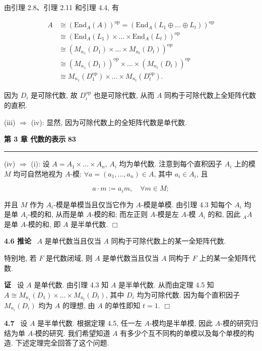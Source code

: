 \documentclass[11pt,a4paper]{article}
\begin{document}
由引理 2.8、引理 2.11 和引理 4.4, 有

$$
\begin{aligned}
A &\cong (\mathrm{End}_A(A))^{\mathrm{op}} = (\mathrm{End}_A(L_1 \oplus \dots \oplus L_t))^{\mathrm{op}} \\
&\cong (\mathrm{End}_A(L_1) \times \dots \times \mathrm{End}_A(L_t))^{\mathrm{op}} \\
&\cong (M_{n_1}(D_1) \times \dots \times M_{n_t}(D_t))^{\mathrm{op}} \\
&\cong (M_{n_1}(D_1))^{\mathrm{op}} \times \dots \times (M_{n_t}(D_t))^{\mathrm{op}} \\
&\cong M_{n_1}(D_1^{\mathrm{op}}) \times \dots \times M_{n_t}(D_t^{\mathrm{op}}).
\end{aligned}
$$

因为 $D_i$ 是可除代数, 故 $D_i^{\mathrm{op}}$ 也是可除代数, 从而 $A$ 同构于可除代数上全矩阵代数的直积.

(iii) $\Rightarrow$ (iv): 显然, 因为可除代数上的全矩阵代数是单代数.

\newpage
\noindent \textbf{第 3 章 \quad 代数的表示} \hfill \textbf{83}
\vspace{0.5em} \hrule \vspace{1.5em}

(iv) $\Rightarrow$ (i): 设 $A = A_1 \times \dots \times A_n$, $A_i$ 均为单代数. 注意到每个直积因子 $A_i$ 上的模 $M$ 均可自然地视为 $A$-模: $\forall a = (a_1, \dots, a_n) \in A$, 其中 $a_i \in A_i$, 且

$$
a \cdot m := a_i m, \quad \forall m \in M;
$$

并且 $M$ 作为 $A_i$-模是单模当且仅当它作为 $A$-模是单模. 由引理 4.3 知每个 $A_i$ 均是单 $A_i$-模的和, 从而是单 $A$-模的和; 而左正则 $A$-模是左 $A$-模 $A_i$ 的和, 因此 ${}_A A$ 是单 $A$-模的和, 即 $A$ 是半单代数. \hfill $\Box$

\vspace{0.5em}
\textbf{4.6 推论} \ $A$ 是单代数当且仅当 $A$ 同构于可除代数上的某一全矩阵代数.

特别地, 若 $F$ 是代数闭域, 则 $A$ 是单代数当且仅当 $A$ 同构于 $F$ 上的某一全矩阵代数.

\textbf{证} \ 设 $A$ 是单代数. 由引理 4.3 知 $A$ 是半单代数. 从而由定理 4.5 知 $A \cong M_{n_1}(D_1) \times \dots \times M_{n_t}(D_t)$, 其中 $D_i$ 均为可除代数. 因为每个直积因子 $M_{n_i}(D_i)$ 均为 $A$ 的理想, 由 $A$ 的单性即知 $t=1$. \hfill $\Box$
\vspace{0.5em}

\textbf{4.7} \ 设 $A$ 是半单代数. 根据定理 4.5, 任一左 $A$-模均是半单模, 因此 $A$-模的研究归结为单 $A$-模的研究. 我们希望知道 $A$ 有多少个互不同构的单模以及每个单模的构造. 下述定理完全回答了这个问题.
\end{document}
